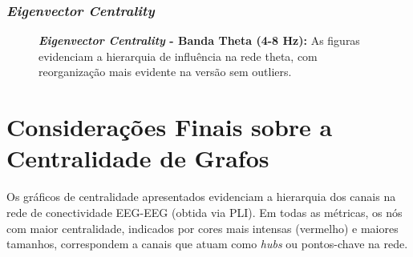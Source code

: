 \subsubsection{\textit{Eigenvector Centrality}}
\begin{figure}[H]
    \centering
    \hfill
    \caption{\small \textbf{\textit{Eigenvector Centrality} - Banda Theta (4-8 Hz):} As figuras evidenciam a hierarquia de influência na rede theta, com reorganização mais evidente na versão sem outliers.}
    \label{fig:eigenvector_theta}
\end{figure}

\section{Considerações Finais sobre a Centralidade de Grafos}
Os gráficos de centralidade apresentados evidenciam a hierarquia dos canais na rede de conectividade EEG-EEG (obtida via PLI). Em todas as métricas, os nós com maior centralidade, indicados por cores mais intensas (vermelho) e maiores tamanhos, correspondem a canais que atuam como \textit{hubs} ou pontos-chave na rede. 


